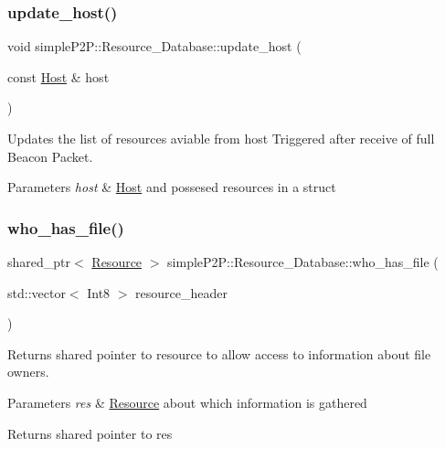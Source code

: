 \subsubsection{\texorpdfstring{update\+\_\+host()}{update\_host()}}
{\footnotesize\ttfamily void simple\+P2\+P\+::\+Resource\+\_\+\+Database\+::update\+\_\+host (\begin{DoxyParamCaption}\item[{const \hyperlink{classsimpleP2P_1_1Host}{Host} \&}]{host }\end{DoxyParamCaption})}



Updates the list of resources aviable from host Triggered after receive of full Beacon Packet. 


\begin{DoxyParams}{Parameters}
{\em host} & \hyperlink{classsimpleP2P_1_1Host}{Host} and possesed resources in a struct \\
\hline
\end{DoxyParams}
\mbox{\label{classsimpleP2P_1_1Resource__Database_a66fde779a931fbeb4f0e7865b63dce33}} 
\subsubsection{\texorpdfstring{who\+\_\+has\+\_\+file()}{who\_has\_file()}\hspace{0.1cm}{\footnotesize\ttfamily [1/2]}}
{\footnotesize\ttfamily shared\+\_\+ptr$<$ \hyperlink{classsimpleP2P_1_1Resource}{Resource} $>$ simple\+P2\+P\+::\+Resource\+\_\+\+Database\+::who\+\_\+has\+\_\+file (\begin{DoxyParamCaption}\item[{std\+::vector$<$ Int8 $>$}]{resource\+\_\+header }\end{DoxyParamCaption})\hspace{0.3cm}{\ttfamily [inline]}}



Returns shared pointer to resource to allow access to information about file owners. 


\begin{DoxyParams}{Parameters}
{\em res} & \hyperlink{classsimpleP2P_1_1Resource}{Resource} about which information is gathered \\
\hline
\end{DoxyParams}
\begin{DoxyReturn}{Returns}
shared pointer to res 
\end{DoxyReturn}
\mbox{\label{classsimpleP2P_1_1Resource__Database_a70aa9503db5700a6abdfdc9b029d71c1}} 

